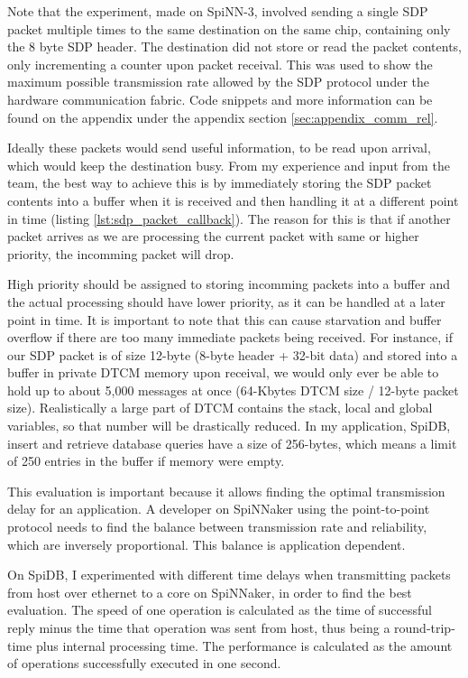 Note that the experiment, made on SpiNN-3, involved sending a single SDP packet multiple times to the same destination on the same chip, containing only the 8 byte SDP header. The destination did not store or read the packet contents, only incrementing a counter upon packet receival. This was used to show the maximum possible transmission rate allowed by the SDP protocol under the hardware communication fabric. Code snippets and more information can be found on the appendix under the appendix section \ref{sec:appendix_comm_rel}.

Ideally these packets would send useful information, to be read upon arrival, which would keep the destination busy. From my experience and input from the team, the best way to achieve this is by immediately storing the SDP packet contents into a buffer when it is received and then handling it at a different point in time (listing \ref{lst:sdp_packet_callback}). The reason for this is that if another packet arrives as we are processing the current packet with same or higher priority, the incomming packet will drop.

High priority should be assigned to storing incomming packets into a buffer and the actual processing should have lower priority, as it can be handled at a later point in time. It is important to note that this can cause starvation and buffer overflow if there are too many immediate packets being received. For instance, if our SDP packet is of size 12-byte (8-byte header + 32-bit data) and stored into a buffer in private DTCM memory upon receival, we would only ever be able to hold up to about 5,000 messages at once (64-Kbytes DTCM size / 12-byte packet size). Realistically a large part of DTCM contains the stack, local and global variables, so that number will be drastically reduced. In my application, SpiDB, insert and retrieve database queries have a size of 256-bytes, which means a limit of 250 entries in the buffer if memory were empty.

This evaluation is important because it allows finding the optimal transmission delay for an application. A developer on SpiNNaker using the point-to-point protocol needs to find the balance between transmission rate and reliability, which are inversely proportional. This balance is application dependent.



On SpiDB, I experimented with different time delays when transmitting packets from host over ethernet to a core on SpiNNaker, in order to find the best evaluation. The speed of one operation is calculated as the time of successful reply minus the time that operation was sent from host, thus being a round-trip-time plus internal processing time. The performance is calculated as the amount of operations successfully executed in one second.

